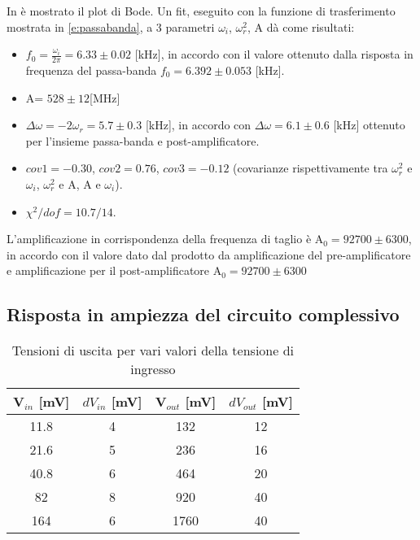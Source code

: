 In  è mostrato il plot di Bode. Un fit, eseguito con la funzione di trasferimento mostrata in \ref{e:passabanda}, a 3 parametri $\omega_i$, $\omega_r^2$, A dà come risultati:
\begin{itemize}
\item $f_0=\frac{\omega_i}{2\pi}= 6.33 \pm 0.02$ [kHz], in accordo con il valore ottenuto dalla risposta in frequenza del passa-banda $f_0 = 6.392 \pm 0.053$ [kHz].
\item A= $528 \pm 12$[MHz]
\item $\Delta \omega =-2\omega_r=  5.7 \pm 0.3$ [kHz], in accordo con $\Delta \omega = 6.1 \pm 0.6$ [kHz] ottenuto per l'insieme passa-banda e post-amplificatore.
\item $cov1 = -0.30$, $cov2 = 0.76$, $cov3 = -0.12$ (covarianze rispettivamente tra $\omega_r^2$ e $\omega_i$, $\omega_r^2$ e A, A e $\omega_i$).
\item $\chi^2/dof = 10.7/14$.
\end{itemize}
L'amplificazione in corrispondenza della frequenza di taglio è A$_0 = 92700 \pm 6300$, in accordo con il valore dato dal prodotto da amplificazione del pre-amplificatore e amplificazione per il post-amplificatore A$_0 = 92700 \pm 6300$

\subsection{Risposta in ampiezza del circuito complessivo}
\begin{table}[h]
	\centering
	\begin{tabular}{cccc}		
		 {V$_{in}$ [mV]} & {$dV_{in}$ [mV]} & {V$_{out}$ [mV]} & {$dV_{out}$ [mV]} \\
		 \midrule
                       11.8 & 4 & 132 & 12 \\
                       21.6 & 5 & 236 & 16 \\
                       40.8 & 6 & 464 & 20 \\
                       82 & 8 & 920 &40 \\
                       164 & 6 & 1760 & 40 \\
 	\end{tabular}
	\caption{Tensioni di uscita per vari valori della tensione di ingresso}
	\label{t:risposta_ampiezza}
\end{table}



